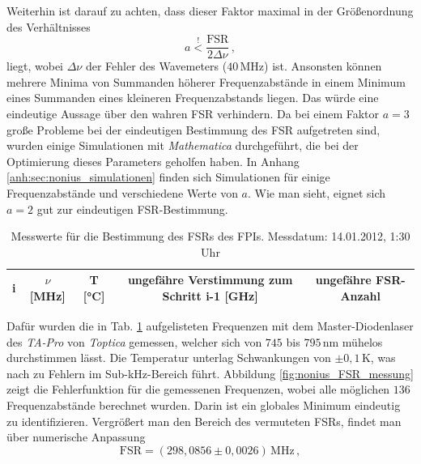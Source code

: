Weiterhin ist darauf zu achten, dass dieser Faktor maximal in der Größenordnung
des Verhältnisses
\begin{equation}\label{eq:nonius_faktor}
	a\stackrel{!}{<}\frac{\text{FSR}}{2\Delta\nu}\,,
\end{equation}
liegt, wobei $\Delta\nu$ der Fehler des Wavemeters ($40\,$MHz) ist. Ansonsten
können mehrere Minima von Summanden höherer Frequenzabstände in einem Minimum
eines Summanden eines kleineren Frequenzabstands liegen. Das würde eine
eindeutige Aussage über den wahren FSR verhindern. Da bei
einem Faktor $a=3$ große Probleme bei der eindeutigen Bestimmung des FSR
aufgetreten sind, wurden einige Simulationen mit \textit{Mathematica}
durchgeführt, die bei der Optimierung dieses Parameters geholfen haben.
In Anhang \ref{anh:sec:nonius_simulationen} finden sich Simulationen für einige
Frequenzabstände und verschiedene Werte von $a$. Wie man sieht, eignet sich
$a=2$ gut zur eindeutigen FSR-Bestimmung.\par
\begin{table}[h]
	\begin{tabular}{ccccc}
		\toprule
		\multicolumn{1}{C{0.05\textwidth}}{i} &
		\multicolumn{1}{C{0.15\textwidth}}{$\nu$ [MHz]} &
		\multicolumn{1}{C{0.10\textwidth}}{T [°C]} &
		\multicolumn{1}{C{0.25\textwidth}}{ungefähre Verstimmung zum
		Schritt i-1 [GHz]} &
		\multicolumn{1}{C{0.23\textwidth}}{ungefähre FSR-Anzahl}\\
		\midrule[1px]
		\hline
		
		\bottomrule[1px]
	\end{tabular}
	\caption[FSR Messung]{Messwerte für die Bestimmung des
	FSRs des FPIs. Messdatum: 14.01.2012, 1:30 Uhr}
	\label{tab:nonius_FSR_messung}
\end{table}
Dafür wurden die in Tab. \ref{tab:nonius_FSR_messung} aufgelisteten Frequenzen
mit dem Master-Diodenlaser des \textit{TA-Pro} von \textit{Toptica} gemessen,
welcher sich von $745$ bis $795\,$nm mühelos durchstimmen lässt.
Die Temperatur unterlag Schwankungen von $\pm0,1\,$K, was nach
\cite{kuschnick:2000:diplomarbeit} zu Fehlern im Sub-kHz-Bereich führt.
Abbildung \ref{fig:nonius_FSR_messung} zeigt die Fehlerfunktion für die
gemessenen Frequenzen, wobei alle möglichen $136$ Frequenzabstände berechnet
wurden. Darin ist ein globales Minimum eindeutig zu identifizieren.
Vergrößert man den Bereich des vermuteten FSRs, findet man über numerische
Anpassung
\begin{equation}\label{eq:FSR_messung}
	\text{FSR}=(298,0856\pm0,0026)\,\text{MHz}\,,
\end{equation}
